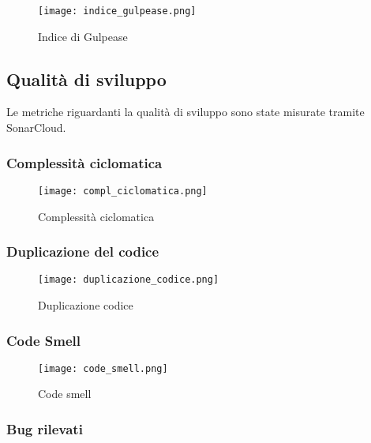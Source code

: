 \documentclass[../piano-di-qualifica.tex]{subfiles}
\begin{document}

\begin{figure}[H]
  \centering
  \texttt{[image: indice\_gulpease.png]}%
  \caption{Indice di Gulpease}%
  \label{fig:gulpease}%
\end{figure}

\newpage

\subsection{Qualità di sviluppo}%
\label{sub:qualita_sviluppo_report}
Le metriche riguardanti la qualità di sviluppo sono state misurate tramite SonarCloud.

\subsubsection{Complessità ciclomatica}%
\label{subs:complessita_ciclomatica}

\begin{figure}[H]
  \centering
  \texttt{[image: compl\_ciclomatica.png]}%
  \caption{Complessità ciclomatica}%
  \label{fig:compl_ciclomatica}%
\end{figure}

\subsubsection{Duplicazione del codice}%
\label{subs:duplicazione_codice}

\begin{figure}[H]
  \centering
  \texttt{[image: duplicazione\_codice.png]}%
  \caption{Duplicazione codice}%
  \label{fig:duplicazione_codice}%
\end{figure}


\subsubsection{Code Smell}%
\label{subs:code_smell}


\begin{figure}[H]
  \centering
  \texttt{[image: code\_smell.png]}%
  \caption{Code smell}%
  \label{fig:code_smell}%
\end{figure}


\subsubsection{Bug rilevati}%
\label{subs:bug_rilevati}
\end{document}
